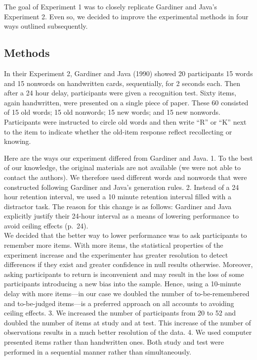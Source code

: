\documentclass[english,,man]{apa6}
\begin{document}
The goal of Experiment 1 was to closely replicate Gardiner and Java's Experiment 2. Even so, we decided to improve the experimental methods in four ways outlined subsequently.

\hypertarget{methods}{%
\subsection{Methods}\label{methods}}

In their Experiment 2, Gardiner and Java (1990) showed 20 participants 15 words and 15 nonwords on handwritten cards, sequentially, for 2 seconds each. Then after a 24 hour delay, participants were given a recognition test. Sixty items, again handwritten, were presented on a single piece of paper. These 60 consisted of 15 old words; 15 old nonwords; 15 new words; and 15 new nonwords. Participants were instructed to circle old words and then write \enquote{R} or \enquote{K} next to the item to indicate whether the old-item response reflect recollecting or knowing.

Here are the ways our experiment differed from Gardiner and Java. 1. To the best of our knowledge, the original materials are not available (we were not able to contact the authors). We therefore used different words and nonwords that were constructed following Gardiner and Java's generation rules. 2. Instead of a 24 hour retention interval, we used a 10 minute retention interval filled with a distractor task. The reason for this change is as follows: Gardiner and Java explicitly justify their 24-hour interval as a means of lowering performance to avoid ceiling effects (p.~24).\\
We decided that the better way to lower performance was to ask participants to remember more items. With more items, the statistical properties of the experiment increase and the experimenter has greater resolution to detect differences if they exist and greater confidence in null results otherwise. Moreover, asking participants to return is inconvenient and may result in the loss of some participants introducing a new bias into the sample. Hence, using a 10-minute delay with more items---in our case we doubled the number of to-be-remembered and to-be-judged items---is a preferred approach on all accounts to avoiding ceiling effects. 3. We increased the number of participants from 20 to 52 and doubled the number of items at study and at test. This increase of the number of observations results in a much better resolution of the data. 4. We used computer presented items rather than handwritten ones. Both study and test were performed in a sequential manner rather than simultaneously.
\end{document}
